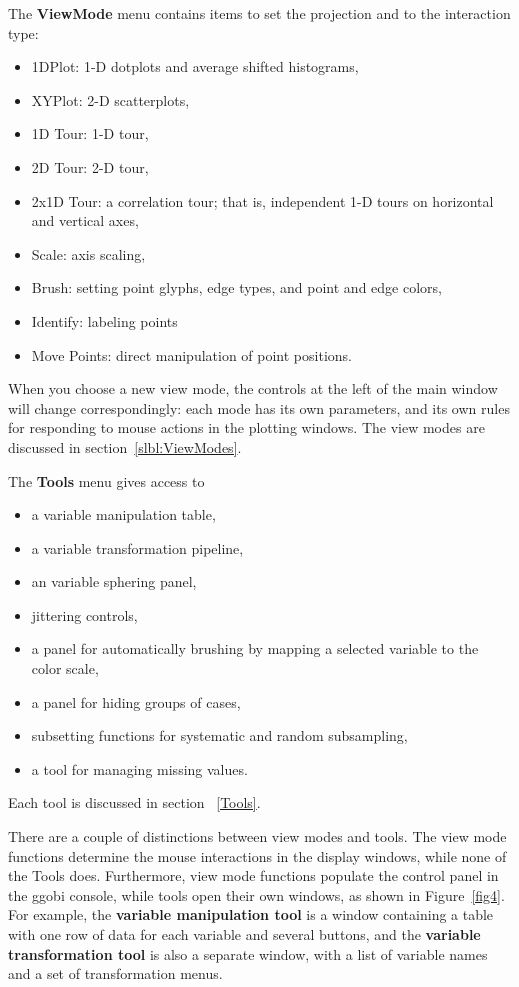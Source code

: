 \documentclass[11pt]{article}
\begin{document}
The {\bf ViewMode} menu contains items to set the projection 
and to the interaction type:
\begin{itemize}
\itemsep 0em
\item 1DPlot: 1-D dotplots and average shifted histograms,
\item XYPlot: 2-D scatterplots,
\item 1D Tour: 1-D tour,
\item 2D Tour: 2-D tour,
\item 2x1D Tour: a correlation tour; that is, independent 1-D tours on
      horizontal and vertical axes,
\item Scale: axis scaling,
\item Brush: setting point glyphs, edge types, and point and edge colors,
\item Identify: labeling points
\item Move Points: direct manipulation of point positions.
\end{itemize}

When you choose a new view mode, the controls at the left of the main
window will change correspondingly:  each mode has its own
parameters, and its own rules for responding to mouse actions in the
plotting windows.  The view modes are discussed in
section~\ref{slbl:ViewModes}.

The {\bf Tools} menu gives access to 
\begin{itemize}
\itemsep 0em
\item a variable manipulation table,
\item a variable transformation pipeline,
\item an variable sphering panel,
\item jittering controls,
\item a panel for automatically brushing by mapping a selected
      variable to the color scale,
\item a panel for hiding groups of cases,
\item subsetting functions for systematic and random subsampling, 
\item a tool for managing missing values.
\end{itemize}

Each tool is discussed in section ~\ref{Tools}.

There are a couple of distinctions between view modes and tools.  The
view mode functions determine the mouse interactions in the display
windows, while none of the Tools does.  Furthermore, view mode
functions populate the control panel in the ggobi console, while
tools open their own windows, as shown in Figure~\ref{fig4}.  For
example, the {\bf variable manipulation tool} is a window containing
a table with one row of data for each variable and several buttons,
and the {\bf variable transformation tool} is also a separate window,
with a list of variable names and a set of transformation menus.
\end{document}
